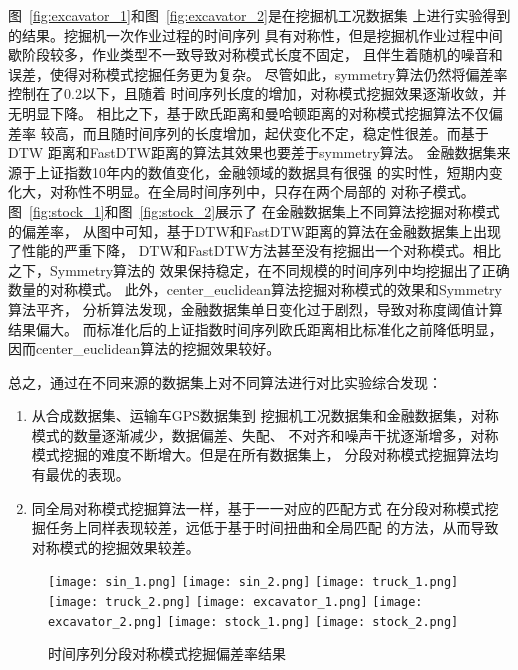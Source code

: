 图~\ref{fig:excavator_1}和图~\ref{fig:excavator_2}是在挖掘机工况数据集
上进行实验得到的结果。挖掘机一次作业过程的时间序列
具有对称性，但是挖掘机作业过程中间歇阶段较多，作业类型不一致导致对称模式长度不固定，
且伴生着随机的噪音和误差，使得对称模式挖掘任务更为复杂。
尽管如此，symmetry算法仍然将偏差率控制在了0.2以下，且随着
时间序列长度的增加，对称模式挖掘效果逐渐收敛，并无明显下降。
相比之下，基于欧氏距离和曼哈顿距离的对称模式挖掘算法不仅偏差率
较高，而且随时间序列的长度增加，起伏变化不定，稳定性很差。而基于DTW
距离和FastDTW距离的算法其效果也要差于symmetry算法。
金融数据集来源于上证指数10年内的数值变化，金融领域的数据具有很强
的实时性，短期内变化大，对称性不明显。在全局时间序列中，只存在两个局部的
对称子模式。图~\ref{fig:stock_1}和图~\ref{fig:stock_2}展示了
在金融数据集上不同算法挖掘对称模式的偏差率，
从图中可知，基于DTW和FastDTW距离的算法在金融数据集上出现了性能的严重下降，
DTW和FastDTW方法甚至没有挖掘出一个对称模式。相比之下，Symmetry算法的
效果保持稳定，在不同规模的时间序列中均挖掘出了正确数量的对称模式。
此外，center\_euclidean算法挖掘对称模式的效果和Symmetry算法平齐，
分析算法发现，金融数据集单日变化过于剧烈，导致对称度阈值计算结果偏大。
而标准化后的上证指数时间序列欧氏距离相比标准化之前降低明显，
因而center\_euclidean算法的挖掘效果较好。

总之，通过在不同来源的数据集上对不同算法进行对比实验综合发现：
\begin{enumerate}
  \item 从合成数据集、运输车GPS数据集到
  挖掘机工况数据集和金融数据集，对称模式的数量逐渐减少，数据偏差、失配、
  不对齐和噪声干扰逐渐增多，对称模式挖掘的难度不断增大。但是在所有数据集上，
  分段对称模式挖掘算法均有最优的表现。
  \item 同全局对称模式挖掘算法一样，基于一一对应的匹配方式
  在分段对称模式挖掘任务上同样表现较差，远低于基于时间扭曲和全局匹配
  的方法，从而导致对称模式的挖掘效果较差。
\end{enumerate}


\begin{figure}
  \centering
  {\texttt{[image: sin\_1.png]}}
  {\texttt{[image: sin\_2.png]}}
  {\texttt{[image: truck\_1.png]}}
  {\texttt{[image: truck\_2.png]}}
  {\texttt{[image: excavator\_1.png]}}
  {\texttt{[image: excavator\_2.png]}}
  {\texttt{[image: stock\_1.png]}}
  {\texttt{[image: stock\_2.png]}}
  \caption{时间序列分段对称模式挖掘偏差率结果}
  \label{fig:segement_symmetry}
\end{figure}

